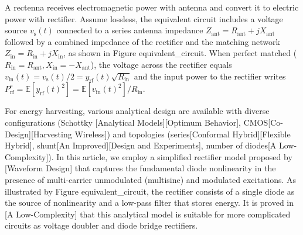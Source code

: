 A rectenna receives electromagnetic power with antenna and convert it to electric power with rectifier. Assume lossless, the equivalent circuit includes a voltage source ${v_{\text{s}}}(t)$ connected to a series antenna impedance ${Z_{{\text{ant}}}} = {R_{{\text{ant}}}} + j{X_{{\text{ant}}}}$ followed by a combined impedance of the rectifier and the matching network ${Z_{{\text{in}}}} = {R_{{\text{in}}}} + j{X_{{\text{in}}}}$, as shown in Figure {equivalent_circuit}. When perfect matched (${R_{{\text{in}}}} = {R_{{\text{ant}}}},{X_{{\text{in}}}} =  - {X_{{\text{ant}}}}$), the voltage across the rectifier equals ${v_{{\text{in}}}}(t) = {v_{\text{s}}}(t)/2 = {y_{{\text{rf}}}}(t)\sqrt {{R_{{\text{in}}}}} $ and the input power to the rectifier writes $P_{{\text{rf}}}^r = \mathbb{E}\left[ {{y_{{\text{rf}}}}{{(t)}^2}} \right] = \mathbb{E}\left[ {{v_{{\text{in}}}}{{(t)}^2}} \right]/{R_{{\text{in}}}}$.

For energy harvesting, various analytical design are available with diverse configurations (Schottky [Analytical Models][Optimum Behavior], CMOS[Co-Design][Harvesting Wireless]) and topologies (series[Conformal Hybrid][Flexible Hybrid], shunt[An Improved][Design and Experiments], number of diodes[A Low-Complexity]). In this article, we employ a simplified rectifier model proposed by [Waveform Design] that captures the fundamental diode nonlinearity in the presence of multi-carrier unmodulated (multisine) and modulated excitations. As illustrated by Figure {equivalent_circuit}, the rectifier consists of a single diode as the source of nonlinearity and a low-pass filter that stores energy. It is proved in [A Low-Complexity] that this analytical model is suitable for more complicated circuits as voltage doubler and diode bridge rectifiers. 